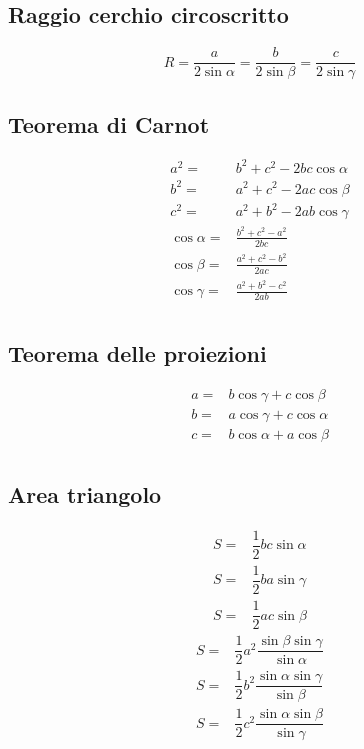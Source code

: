 \subsection{Raggio cerchio circoscritto}
\begin{equation*}
R=\dfrac{a}{2\sin\alpha}=\dfrac{b}{2\sin\beta}=\dfrac{c}{2\sin\gamma}
\end{equation*}
\subsection{Teorema di Carnot}
\begin{align*}
a^2=&b^2+c^2-2bc\cos\alpha\\
b^2=&a^2+c^2-2ac\cos\beta\\
c^2=&a^2+b^2-2ab\cos\gamma\\
\cos\alpha=&\frac{b^2+c^2-a^2}{2bc}\\
\cos\beta=&\frac{a^2+c^2-b^2}{2ac}\\
\cos\gamma=&\frac{a^2+b^2-c^2}{2ab}\\
\end{align*}
\subsection{Teorema delle proiezioni}
\begin{align*}
a=&b\cos\gamma+c\cos\beta\\
b=&a\cos\gamma+c\cos\alpha\\
c=&b\cos\alpha+a\cos\beta\\
\end{align*}
\subsection{Area triangolo}
\begin{align*}
S=&\dfrac{1}{2}bc\sin\alpha\\
S=&\dfrac{1}{2}ba\sin\gamma\\
S=&\dfrac{1}{2}ac\sin\beta
\end{align*}
\begin{align*}
S=&\dfrac{1}{2}a^2\dfrac{\sin\beta\sin\gamma}{\sin\alpha}\\
S=&\dfrac{1}{2}b^2\dfrac{\sin\alpha\sin\gamma}{\sin\beta}\\
S=&\dfrac{1}{2}c^2\dfrac{\sin\alpha\sin\beta}{\sin\gamma}
\end{align*}